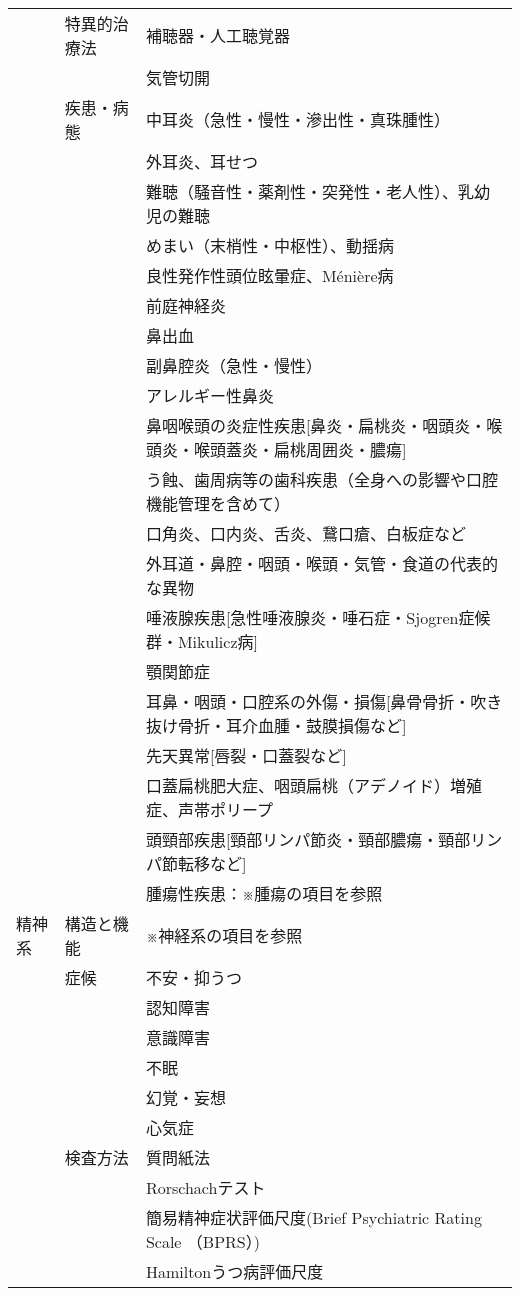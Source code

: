 \begin{xltabular}{\linewidth}{XXX}
 & 特異的治療法 & 補聴器・人工聴覚器 \\
 &  & 気管切開 \\
 & 疾患・病態 & 中耳炎（急性・慢性・滲出性・真珠腫性） \\
 &  & 外耳炎、耳せつ \\
 &  & 難聴（騒音性・薬剤性・突発性・老人性）、乳幼児の難聴 \\
 &  & めまい（末梢性・中枢性）、動揺病 \\
 &  & 良性発作性頭位眩暈症、Ménière病 \\
 &  & 前庭神経炎 \\
 &  & 鼻出血 \\
 &  & 副鼻腔炎（急性・慢性） \\
 &  & アレルギー性鼻炎 \\
 &  & 鼻咽喉頭の炎症性疾患[鼻炎・扁桃炎・咽頭炎・喉頭炎・喉頭蓋炎・扁桃周囲炎・膿瘍] \\
 &  & う蝕、歯周病等の歯科疾患（全身への影響や口腔機能管理を含めて） \\
 &  & 口角炎、口内炎、舌炎、鵞口瘡、白板症など \\
 &  & 外耳道・鼻腔・咽頭・喉頭・気管・食道の代表的な異物 \\
 &  & 唾液腺疾患[急性唾液腺炎・唾石症・Sjogren症候群・Mikulicz病] \\
 &  & 顎関節症 \\
 &  & 耳鼻・咽頭・口腔系の外傷・損傷[鼻骨骨折・吹き抜け骨折・耳介血腫・鼓膜損傷など] \\
 &  & 先天異常[唇裂・口蓋裂など] \\
 &  & 口蓋扁桃肥大症、咽頭扁桃（アデノイド）増殖症、声帯ポリープ \\
 &  & 頭頸部疾患[頸部リンパ節炎・頸部膿瘍・頸部リンパ節転移など] \\
 &  & 腫瘍性疾患：※腫瘍の項目を参照 \\
精神系 & 構造と機能 & ※神経系の項目を参照 \\
 & 症候 & 不安・抑うつ \\
 &  & 認知障害 \\
 &  & 意識障害 \\
 &  & 不眠 \\
 &  & 幻覚・妄想 \\
 &  & 心気症 \\
 & 検査方法 & 質問紙法 \\
 &  & Rorschachテスト \\
 &  & 簡易精神症状評価尺度(Brief Psychiatric Rating Scale （BPRS）) \\
 &  & Hamiltonうつ病評価尺度 \\

\end{xltabular}
